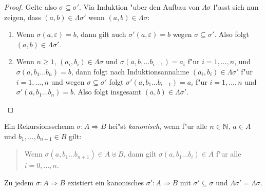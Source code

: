 \documentclass[12pt,a4paper]{article}
\begin{document}
\begin{proof}
  Gelte also $\sigma \subseteq \sigma'$. Via Induktion "uber den Aufbau von $\Lambda\sigma$ l"asst sich nun zeigen,
  dass $(a,b) \in \Lambda \sigma'$ wenn $(a,b) \in \Lambda \sigma$:
  \begin{enumerate}
  \item Wenn $\sigma(a,\varepsilon) = b$, dann gilt auch $\sigma'(a,\varepsilon)=b$ wegen
    $\sigma\subseteq\sigma'$. Also folgt $(a,b) \in \Lambda \sigma'$.
  \item Wenn $n \ge 1$, $(a_i,b_i) \in \Lambda \sigma$ und $\sigma(a,b_1 \ldots b_{i-1})=a_i$ f"ur $i=1,\ldots,n$,
    und $\sigma(a,b_1 \ldots b_n) = b$, dann folgt nach Induktionsannahme $(a_i,b_i)\in\Lambda \sigma'$
    f"ur $i=1,\ldots,n$ und wegen $\sigma \subseteq \sigma'$ folgt $\sigma'(a,b_1 \ldots b_{i-1})=a_i$
    f"ur $i=1,\ldots,n$ und $\sigma'(a,b_1 \ldots b_n) =b$. Also folgt insgesamt $(a,b) \in \Lambda \sigma'$.
  \end{enumerate}
\end{proof}

\begin{definition}
  Ein Rekursionsschema $\sigma: A \Rightarrow B$ hei"st \emph{kanonisch}, wenn
  f"ur alle $n \in \mathbb N$, $a \in A$ und $b_1,\ldots,b_{n+1} \in B$ gilt:
  \begin{quote}
    Wenn $\sigma(a,b_1 \ldots b_{n+1}) \in A \uplus B$, dann gilt
    $\sigma(a,b_1 \ldots b_i) \in A$ f"ur alle $i = 0,\ldots,n$.
  \end{quote}
\end{definition}

\begin{lemma}
  Zu jedem $\sigma: A \Rightarrow B$ existiert ein kanonisches $\sigma':A \Rightarrow B$ mit
  $\sigma' \subseteq \sigma$ und $\Lambda \sigma' = \Lambda \sigma$.
\end{lemma}
\end{document}
